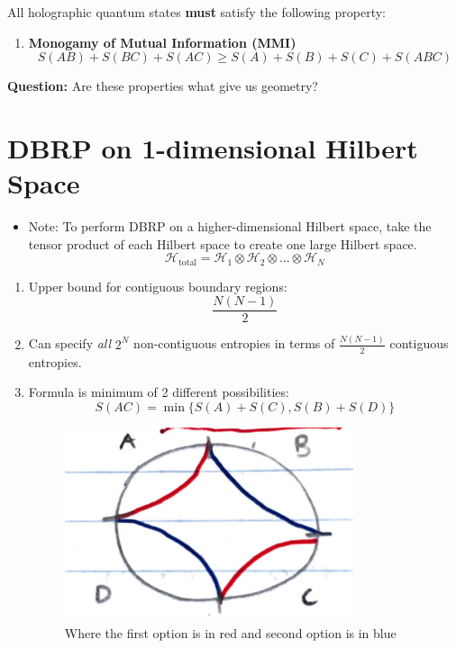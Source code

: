 \documentclass[12pt]{article}
\begin{document}
All holographic quantum states \textbf{must} satisfy the following property:
\begin{enumerate}
    \item \textbf{Monogamy of Mutual Information (MMI)}
    \[
    S(AB) + S(BC) + S(AC) \geq S(A) + S(B) + S(C) + S(ABC)
    \]
\end{enumerate}

\textbf{Question:} Are these properties what give us geometry?

\section*{DBRP on 1-dimensional Hilbert Space}
\begin{itemize}
    \item Note: To perform DBRP on a higher-dimensional Hilbert space, take the tensor product of each Hilbert space to create one large Hilbert space.
    \[
    \mathcal{H}_{\text{total}} = \mathcal{H}_1 \otimes \mathcal{H}_2 \otimes \dots \otimes \mathcal{H}_N
    \]
\end{itemize}
\begin{enumerate}
    \item Upper bound for contiguous boundary regions: 
    \[
    \frac{N(N-1)}{2}
    \]
    \item Can specify \textit{all} \( 2^N \) non-contiguous entropies in terms of \( \frac{N(N-1)}{2} \) contiguous entropies.
    \item Formula is minimum of 2 different possibilities:
    \[
    S(AC) = \min\{ S(A) + S(C), S(B) + S(D) \}
    \]
    \begin{figure}[htbp]  %
        \centering
        \includegraphics[width=0.8\textwidth]{parts.pdf}  %
        \caption{Where the first option is in red and second option is in blue}  %
        \label{fig:example}  %
    \end{figure}
\end{enumerate}
\end{document}
